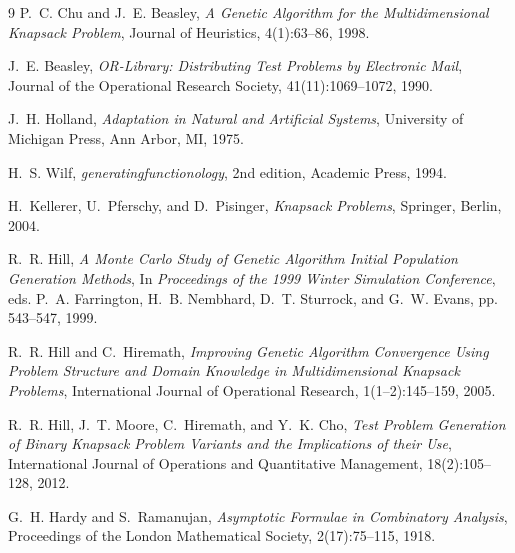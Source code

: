 \documentclass[twocolumn]{article}
\begin{document}
\begin{thebibliography}{9}
P.~C. Chu and J.~E. Beasley,
\textit{A Genetic Algorithm for the Multidimensional Knapsack Problem},
Journal of Heuristics, 4(1):63--86, 1998.

J.~E. Beasley,
\textit{OR-Library: Distributing Test Problems by Electronic Mail},
Journal of the Operational Research Society, 41(11):1069--1072, 1990.

J.~H. Holland,
\textit{Adaptation in Natural and Artificial Systems},
University of Michigan Press, Ann Arbor, MI, 1975.

H.~S. Wilf,
\textit{generatingfunctionology},
2nd edition, Academic Press, 1994.

H.~Kellerer, U.~Pferschy, and D.~Pisinger,
\textit{Knapsack Problems},
Springer, Berlin, 2004.

R.~R. Hill,
\textit{A Monte Carlo Study of Genetic Algorithm Initial Population Generation Methods},
In \textit{Proceedings of the 1999 Winter Simulation Conference},
eds. P.~A. Farrington, H.~B. Nembhard, D.~T. Sturrock, and G.~W. Evans,
pp. 543--547, 1999.

R.~R. Hill and C.~Hiremath,
\textit{Improving Genetic Algorithm Convergence Using Problem Structure and Domain Knowledge in Multidimensional Knapsack Problems},
International Journal of Operational Research,
1(1--2):145--159, 2005.

R.~R. Hill, J.~T. Moore, C.~Hiremath, and Y.~K. Cho,
\textit{Test Problem Generation of Binary Knapsack Problem Variants and the Implications of their Use},
International Journal of Operations and Quantitative Management,
18(2):105--128, 2012.

G.~H. Hardy and S.~Ramanujan,
\textit{Asymptotic Formulae in Combinatory Analysis},
Proceedings of the London Mathematical Society, 2(17):75--115, 1918.
\end{thebibliography}
\end{document}
